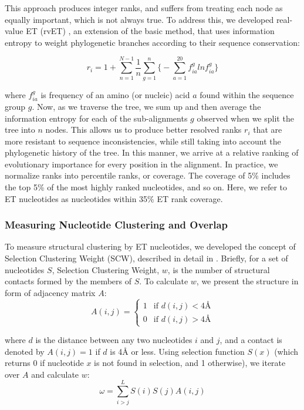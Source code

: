 \documentclass[12pt,a4paper]{report}
\begin{document}
This approach produces integer ranks, and suffers from treating each node as equally important, which is not always true. To address this, we developed real-value ET (rvET) \cite{Wilkins2012, Mihalek2004}, an extension of the basic method, that uses information entropy to weight phylogenetic branches according to their sequence conservation:

\begin{equation*} \label{eq:realval_et_equation}
r_i = 1+\sum_{n=1}^{N-1} \frac{1}{n} \sum_{g=1}^n\bigg\{-\sum_{a=1}^{20}f_{ia}^{g}lnf_{ia}^{g}\bigg\}
\tag{2}
\end{equation*}

where $f_{ia}^{g}$ is frequency of an amino (or nucleic) acid $a$ found within the sequence group $g$. Now, as we traverse the tree, we sum up and then average the information entropy for each of the sub-alignments $g$ observed when we split the tree into $n$ nodes. This allows us to produce better resolved ranks $r_{i}$ that are more resistant to sequence inconsistencies, while still taking into account the phylogenetic history of the tree. In this manner, we arrive at a relative ranking of evolutionary importance for every position in the alignment. In practice, we normalize ranks into percentile ranks, or coverage. The coverage of 5\% includes the top 5\% of the most highly ranked nucleotides, and so on. Here, we refer to ET nucleotides as nucleotides within 35\% ET rank coverage.
\subsubsection{Measuring Nucleotide Clustering and Overlap}
To measure structural clustering by ET nucleotides, we developed the concept of Selection Clustering Weight (SCW), described in detail in \cite{Mihalek2003}. Briefly, for a set of nucleotides $S$, Selection Clustering Weight, $w$, is the number of structural contacts formed by the members of $S$. To calculate $w$, we present the structure in form of adjacency matrix $A$:
\begin{equation*} \label{eq:et_adj_matrix}
A(i,j) = \begin{cases}
1 &\text{if $d(i,j) < 4\text{\AA}$}\\
0 &\text{if $d(i,j) > 4\text{\AA}$}
\end{cases}
\tag{3}
\end{equation*}

where $d$ is the distance between any two nucleotides $i$ and $j$, and a contact is denoted by $A(i, j)=1$ if $d$ is 4{\AA} or less. Using selection function $S(x)$ (which returns 0 if nucleotide $x$ is not found in selection, and 1 otherwise), we iterate over $A$ and calculate $w$: 
\begin{equation*} \label{eq:zclust_equation}
\omega = \sum_{i>j}^{L}S(i)S(j)A(i,j)
\tag{4}
\end{equation*}
\end{document}
